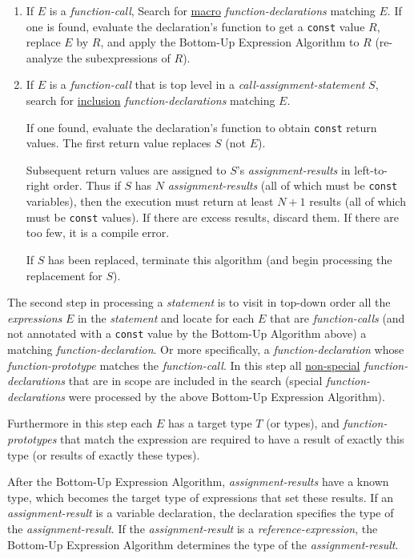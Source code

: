 \documentclass[12pt]{article}
\begin{document}
\begin{enumerate}
\item\label{MACRO-FUNCTION-STEP}
If $E$ is a {\em function-call},
Search for \underline{macro} {\em function-declarations}
matching $E$.  If one is found,
evaluate the declaration's function to get a {\tt const} value $R$,
replace $E$ by $R$, and apply the Bottom-Up Expression Algorithm to $R$
(re-analyze the subexpressions of $R$).

\item\label{INCLUSION-FUNCTION-STEP}
If $E$ is a {\em function-call}
that is top level in a {\em call-assignment-statement} $S$,
search for \underline{inclusion} {\em function-declarations}
matching $E$.

If one found, evaluate the declaration's function to obtain
{\tt const} return values.
The first return value replaces $S$ (not $E$).

Subsequent return values are assigned to $S$'s {\em assignment-results}
in left-to-right order.
Thus if $S$
has $N$ {\em assignment-results} (all of which must be {\tt const} variables),
then the execution must return at
least $N+1$ results (all of which must be {\tt const} values).
If there are excess results, discard them.  If there are too few,
it is a compile error.

If $S$ has been replaced, terminate this algorithm (and begin processing
the replacement for $S$).

\end{enumerate}

The second step in processing a {\em statement} is to visit in top-down order
all the {\em expressions} $E$ in the {\em statement}
and locate for each $E$ that are {\em function-calls}
(and not annotated with a {\tt const} value by the Bottom-Up Algorithm above)
a matching {\em function-declaration}.  Or more specifically,
a {\em function-declaration} whose {\em function-prototype} matches
the {\em function-call}.  In this step all \underline{non-special}
{\em function-declarations} that are in scope are included in the search
(special {\em function-declarations} were processed by the above
Bottom-Up Expression Algorithm).

Furthermore in this step each $E$ has a target type $T$ (or types),
and {\em function-prototypes} that match the expression are required to
have a result of exactly this type (or results of exactly these types).

After the Bottom-Up Expression Algorithm, {\em assignment-results}
have a known type, which becomes the target type of expressions that
set these results.  If an {\em assignment-result} is a variable declaration,
the declaration specifies the type of the {\em assignment-result}.
If the {\em assignment-result} is a {\em reference-expression}, the
Bottom-Up Expression Algorithm
determines the type of the {\em assignment-result}.
\end{document}
